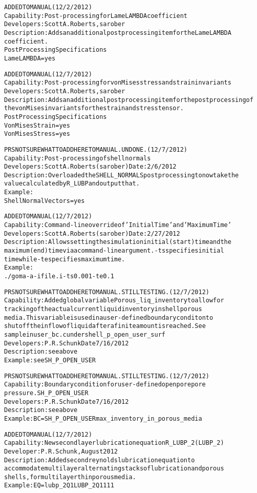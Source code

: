 \documentclass{article}
\begin{document}
\begin{alltt}
ADDED TO MANUAL (12/2/2012)
Capability:  Post-processing for Lame LAMBDA coefficient
Developers:  Scott A. Roberts, sarober
Description:  Adds an additional post processing item for the Lame LAMBDA
coefficient.
Post Processing Specifications
Lame LAMBDA = yes

ADDED TO MANUAL (12/7/2012)
Capability:  Post-processing for von Mises stress and strain invariants
Developers:  Scott A. Roberts, sarober
Description:  Adds an additional post processing item for the post processing of
 the von Mises invariants for the strain and stress tensor.
Post Processing Specifications
Von Mises Strain = yes
Von Mises Stress = yes

PRS NOT SURE WHAT TO ADD HERE TO MANUAL. UNDONE.   (12/7/2012)
Capability:  Post-processing of shell normals
Developers:  Scott A. Roberts (sarober)  Date:  2/6/2012
Description:  Overloaded the SHELL_NORMALS post processing to now take the
  value calculated by R_LUBP and output that.
Example:
  Shell Normal Vectors = yes

ADDED TO MANUAL (12/7/2012)
Capability:  Command-line override of 'Initial Time' and 'Maximum Time'
Developers:  Scott A. Roberts (sarober)  Date:  2/27/2012
Description:  Allows setting the simulation initial (start) time and the
  maximum (end) time via a command-line argument.  -ts specifies initial
  time while -te specifies maximum time.
Example:
  ./goma -a -i file.i -ts 0.001 -te 0.1

PRS NOT SURE WHAT TO ADD HERE TO MANUAL. STILL TESTING.   (12/7/2012)
Capability:   Added global variable Porous_liq_inventory to allow for
tracking of the actual current liquid inventory in shell porous
media.  This variable is used in a user-defined boundary conditon to
shut off the inflow of liquid after a finite amount is reached.   See
sample in user_bc.c under shell_p_open_user_surf
Developers: P. R. Schunk Date 7/16/2012
Description: see above
Example: see SH_P_OPEN_USER

PRS NOT SURE WHAT TO ADD HERE TO MANUAL. STILL TESTING.   (12/7/2012)
Capability: Boundary condition for user-defined open pore pore
pressure.   SH_P_OPEN_USER
Developers: P. R. Schunk Date 7/16/2012
Description: see above
Example: BC = SH_P_OPEN_USER {max_inventory_in_porous_media}

ADDED TO MANUAL (12/7/2012)
Capability:  New second layer lubrication equation R_LUBP_2 (LUBP_2)
Developer: P. R. Schunk, August 2012
Description:  Added second reynolds lubrication equation to
accommodate multilayer alternating stacks of lubrication and porous
shells, for multilayer thin porous media.  
Example: EQ = lubp_2             Q1 LUBP_2        Q1         1   1   1


\end{alltt}
\end{document}
